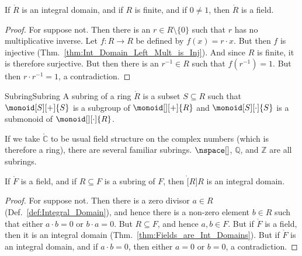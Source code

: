     \begin{theorem}
        \label{thm:Finite_Int_Domain_if_Field}%
        If $\ring{R}$ is an integral domain, and if $R$ is finite, and if
        $0\ne{1}$, then $\ring{R}$ is a field.
    \end{theorem}
    \begin{proof}
        For suppose not. Then there is an $r\in{R}\setminus\{0\}$ such that
        $r$ has no multiplicative inverse. Let $f:R\rightarrow{R}$ be
        defined by $f(x)=r\cdot{x}$. But then $f$ is injective
        (Thm.~\ref{thm:Int_Domain_Left_Mult_is_Inj}). And since $R$ is
        finite, it is therefore surjective. But then there is an
        $r^{\minus{1}}\in{R}$ such that $f(r^{\minus{1}})=1$. But then
        $r\cdot{r}^{\minus{1}}=1$, a contradiction.
    \end{proof}
    \begin{fdefinition}{Subring}{Subring}
        A subring of a ring $\ring{R}$ is a subset $S\subseteq{R}$ such that
        $\monoid[S][+]{S}$ is a subgroup of $\monoid[][+]{R}$ and
        $\monoid[S][\cdot]{S}$ is a submonoid of $\monoid[][\cdot]{R}$.
    \end{fdefinition}
    \begin{example}
        If we take $\ring{\mathbb{C}}$ to be usual field structure on the
        complex numbers (which is therefore a ring), there are several
        familiar subrings. $\nspace[]$, $\mathbb{Q}$, and $\mathbb{Z}$ are
        all subrings.
    \end{example}
    \begin{theorem}
        \label{thm:Subring_of_Field_is_Int_Domain}%
        If $\ring{F}$ is a field, and if $R\subseteq{F}$ is a subring of
        $F$, then $\ring[R]{R}$ is an integral domain.
    \end{theorem}
    \begin{proof}
        For suppose not. Then there is a zero divisor $a\in{R}$
        (Def.~\ref{def:Integral_Domain}), and hence there is a non-zero
        element $b\in{R}$ such that either $a\cdot{b}=0$ or $b\cdot{a}=0$.
        But $R\subseteq{F}$, and hence $a,b\in{F}$. But if $\ring{F}$ is a
        field, then it is an integral domain
        (Thm.~\ref{thm:Fields_are_Int_Domains}). But if $\ring{F}$ is an
        integral domain, and if $a\cdot{b}=0$, then either $a=0$ or $b=0$,
        a contradiction.
    \end{proof}
